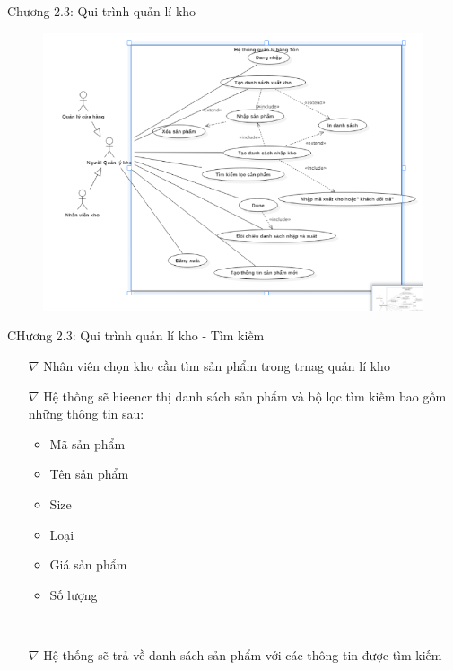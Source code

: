 \documentclass{beamer}
\begin{document}
\begin{frame}{Chương 2.3: Qui trình quản lí kho}
    \begin{figure}
        \centering
        \includegraphics[scale = 0.6]{6.png}
    \end{figure}
\end{frame}
\begin{frame}{CHương 2.3: Qui trình quản lí kho - Tìm kiếm}
    \begin{itemize}
        \item[$\nabla$]Nhân viên chọn kho cần tìm sản phẩm trong trnag quản lí kho
        \item[$\nabla$]Hệ thống sẽ hieencr thị danh sách sản phẩm và bộ lọc tìm kiếm bao gồm những thông tin sau:
            \begin{itemize}
                \item Mã sản phẩm
                \item Tên sản phẩm
                \item Size
                \item Loại
                \item Giá sản phẩm
                \item Số lượng
            \end{itemize}\\
        \item[$\nabla$]Hệ thống sẽ trả về danh sách sản phẩm với các thông tin được tìm kiếm \\
    \end{itemize}
\end{frame}
\end{document}
